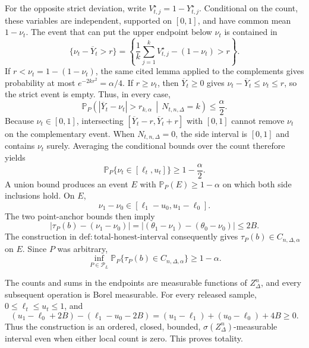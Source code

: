 For the opposite strict deviation, write \(V_{t,j}^{\star}=1-Y_{t,j}^{\star}\).  Conditional on the count, these variables are independent, supported on \([0,1]\), and have common mean \(1-\nu_t\).  The event that can put the upper endpoint below \(\nu_t\) is contained in
\[
 \{\nu_t-\overline Y_t>r\}
 =\left\{\frac1k\sum_{j=1}^kV_{t,j}^{\star}-(1-\nu_t)>r\right\}.
\]
If \(r<\nu_t=1-(1-\nu_t)\), the same cited lemma applied to the complements gives probability at most \(e^{-2kr^2}=\alpha/4\).  If \(r\geq\nu_t\), then \(\overline Y_t\geq0\) gives \(\nu_t-\overline Y_t\leq\nu_t\leq r\), so the strict event is empty.  Thus, in every case,
\[
 \mathbb P_P\!\left(|\overline Y_t-\nu_t|>r_{k,\alpha}\,\middle|\,N_{t,n,\Delta}=k\right)
 \leq\frac\alpha2.
\]
Because \(\nu_t\in[0,1]\), intersecting \([\overline Y_t-r,\overline Y_t+r]\) with \([0,1]\) cannot remove \(\nu_t\) on the complementary event.  When \(N_{t,n,\Delta}=0\), the side interval is \([0,1]\) and contains \(\nu_t\) surely.  Averaging the conditional bounds over the count therefore yields
\[
 \mathbb P_P\{\nu_t\in[\ell_t,u_t]\}\geq1-\frac\alpha2.
\]
A union bound produces an event \(E\) with \(\mathbb P_P(E)\geq1-\alpha\) on which both side inclusions hold.  On \(E\),
\[
 \nu_1-\nu_0\in[\ell_1-u_0,u_1-\ell_0].
\]
The two point-anchor bounds then imply
\[
 |\tau_P(b)-(\nu_1-\nu_0)|
 =| (\theta_1-\nu_1)-(\theta_0-\nu_0)|
 \leq2B.
\]
The construction in \(\mathrm{def:total\text{-}honest\text{-}interval}\) consequently gives \(\tau_P(b)\in C_{n,\Delta,\alpha}\) on \(E\).  Since \(P\) was arbitrary,
\[
 \inf_{P\in\mathcal P_L}\mathbb P_P\{\tau_P(b)\in C_{n,\Delta,\alpha}\}\geq1-\alpha.
\]

The counts and sums in the endpoints are measurable functions of \(Z_\Delta^n\), and every subsequent operation is Borel measurable.  For every released sample, \(0\leq\ell_t\leq u_t\leq1\), and
\[
 (u_1-\ell_0+2B)-(\ell_1-u_0-2B)
 =(u_1-\ell_1)+(u_0-\ell_0)+4B\geq0.
\]
Thus the construction is an ordered, closed, bounded, \(\sigma(Z_\Delta^n)\)-measurable interval even when either local count is zero.  This proves totality.

